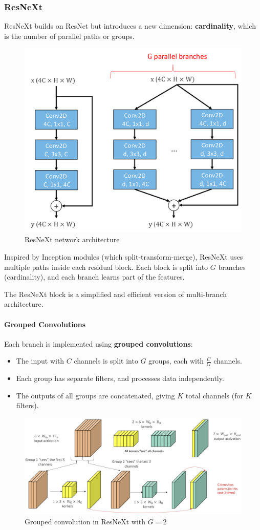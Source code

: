 \subsubsection{ResNeXt}
ResNeXt builds on ResNet but introduces a new dimension: \textbf{cardinality}, which is the number of parallel paths or groups.

\begin{figure}[htbp]
  \centering
  \includegraphics[width=0.5\linewidth]{./img/resnext.png}
  \caption{ResNeXt network architecture}
\end{figure}

Inspired by Inception modules (which split-transform-merge), ResNeXt uses multiple paths inside each residual block. Each block is split into $G$ branches (cardinality), and each branch learns part of the features.

The ResNeXt block is a simplified and efficient version of multi-branch architecture.

\paragraph{Grouped Convolutions}
Each branch is implemented using \textbf{grouped convolutions}:
\begin{itemize}
  \item The input with $C$ channels is split into $G$ groups, each with $\frac{C}{G}$ channels.
  \item Each group has separate filters, and processes data independently.
  \item The outputs of all groups are concatenated, giving $K$ total channels (for $K$ filters).
\end{itemize}

\begin{figure}[htbp]
  \centering
  \includegraphics[width=0.6\linewidth]{./img/grouped_convolutions.jpg}
  \caption{Grouped convolution in ResNeXt with $G=2$}
\end{figure}

